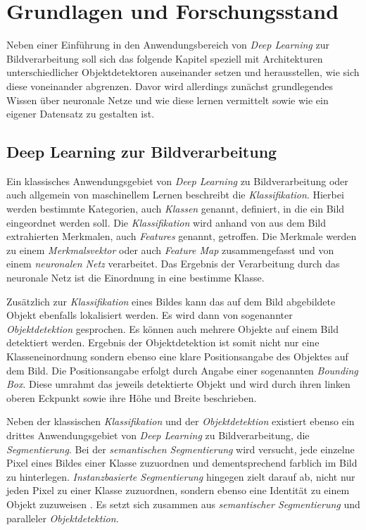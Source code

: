 \chapter{Grundlagen und Forschungsstand}

Neben einer Einführung in den Anwendungsbereich von \textit{Deep Learning} zur Bildverarbeitung soll sich das folgende Kapitel speziell mit Architekturen unterschiedlicher Objektdetektoren auseinander setzen und herausstellen, wie sich diese voneinander abgrenzen. Davor wird allerdings zunächst grundlegendes Wissen über neuronale Netze und wie diese \glqq lernen\grqq{} vermittelt sowie wie ein eigener Datensatz zu gestalten ist.

\section{Deep Learning zur Bildverarbeitung} \label{bildverarbeitung}

Ein klassisches Anwendungsgebiet von \textit{Deep Learning} zu Bildverarbeitung oder auch allgemein von maschinellem Lernen beschreibt die \textit{Klassifikation}. Hierbei werden bestimmte Kategorien, auch \textit{Klassen} genannt, definiert, in die ein Bild eingeordnet werden soll. Die \textit{Klassifikation} wird anhand von aus dem Bild extrahierten Merkmalen, auch \textit{Features} genannt, getroffen. Die Merkmale werden zu einem \textit{Merkmalsvektor} oder auch \textit{Feature Map} zusammengefasst und von einem \textit{neuronalen Netz} verarbeitet. Das Ergebnis der Verarbeitung durch das neuronale Netz ist die Einordnung in eine bestimme Klasse. 

Zusätzlich zur \textit{Klassifikation} eines Bildes kann das auf dem Bild abgebildete Objekt ebenfalls lokalisiert werden. Es wird dann von sogenannter \textit{Objektdetektion} gesprochen. Es können auch mehrere Objekte auf einem Bild detektiert werden. Ergebnis der Objektdetektion ist somit nicht nur eine Klasseneinordnung sondern ebenso eine klare Positionsangabe des Objektes auf dem Bild. Die Positionsangabe erfolgt durch Angabe einer sogenannten \textit{Bounding Box}. Diese umrahmt das jeweils detektierte Objekt und wird durch ihren linken oberen Eckpunkt sowie ihre Höhe und Breite beschrieben. 

Neben der klassischen \textit{Klassifikation} und der \textit{Objektdetektion} existiert ebenso ein drittes Anwendungsgebiet von \textit{Deep Learning} zu Bildverarbeitung, die \textit{Segmentierung}. Bei der \textit{semantischen Segmentierung} wird versucht, jede einzelne Pixel eines Bildes einer Klasse zuzuordnen und dementsprechend farblich im Bild zu hinterlegen. \textit{Instanzbasierte Segmentierung} hingegen zielt darauf ab, nicht nur jeden Pixel zu einer Klasse zuzuordnen, sondern ebenso eine Identität zu einem Objekt zuzuweisen \cite{RavindraParmar.20180902}. Es setzt sich zusammen aus \textit{semantischer Segmentierung} und paralleler \textit{Objektdetektion}.

